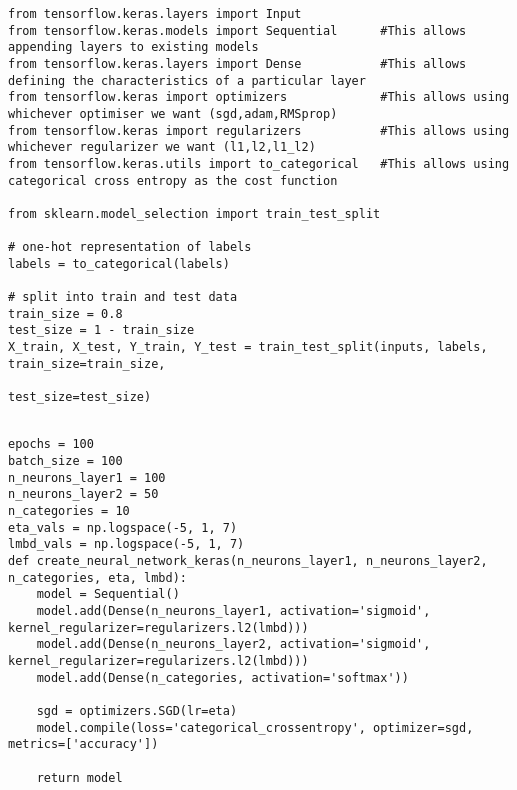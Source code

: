 \begin{verbatim}
from tensorflow.keras.layers import Input
from tensorflow.keras.models import Sequential      #This allows appending layers to existing models
from tensorflow.keras.layers import Dense           #This allows defining the characteristics of a particular layer
from tensorflow.keras import optimizers             #This allows using whichever optimiser we want (sgd,adam,RMSprop)
from tensorflow.keras import regularizers           #This allows using whichever regularizer we want (l1,l2,l1_l2)
from tensorflow.keras.utils import to_categorical   #This allows using categorical cross entropy as the cost function

from sklearn.model_selection import train_test_split

# one-hot representation of labels
labels = to_categorical(labels)

# split into train and test data
train_size = 0.8
test_size = 1 - train_size
X_train, X_test, Y_train, Y_test = train_test_split(inputs, labels, train_size=train_size,
                                                    test_size=test_size)

\end{verbatim}





















\begin{verbatim}

epochs = 100
batch_size = 100
n_neurons_layer1 = 100
n_neurons_layer2 = 50
n_categories = 10
eta_vals = np.logspace(-5, 1, 7)
lmbd_vals = np.logspace(-5, 1, 7)
def create_neural_network_keras(n_neurons_layer1, n_neurons_layer2, n_categories, eta, lmbd):
    model = Sequential()
    model.add(Dense(n_neurons_layer1, activation='sigmoid', kernel_regularizer=regularizers.l2(lmbd)))
    model.add(Dense(n_neurons_layer2, activation='sigmoid', kernel_regularizer=regularizers.l2(lmbd)))
    model.add(Dense(n_categories, activation='softmax'))
    
    sgd = optimizers.SGD(lr=eta)
    model.compile(loss='categorical_crossentropy', optimizer=sgd, metrics=['accuracy'])
    
    return model

\end{verbatim}


















